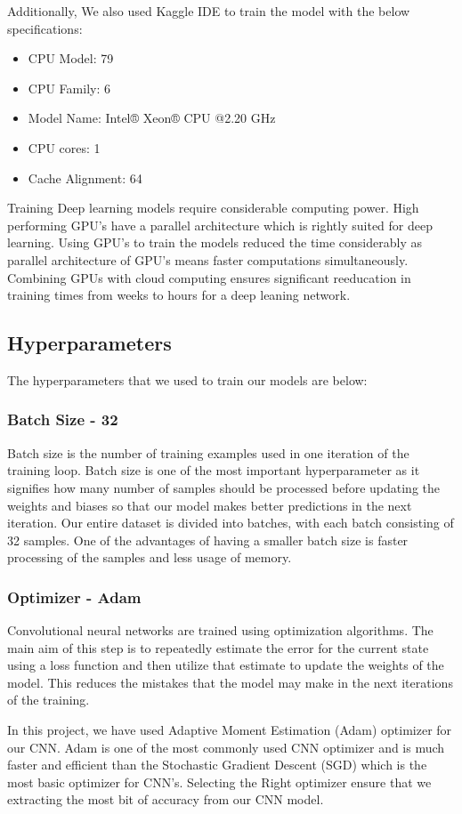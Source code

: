 \documentclass[conference]{IEEEtran}
\begin{document}
\vspace{5pt}
Additionally, We also used Kaggle IDE to train the model with the below specifications:
\begin{itemize}
  \item CPU Model: 79
  \item CPU Family: 6
  \item Model Name: Intel® Xeon® CPU @2.20 GHz
  \item CPU cores: 1
  \item Cache Alignment: 64
\end{itemize}

Training Deep learning models require considerable computing power. High performing GPU's have a parallel architecture which is rightly suited for deep learning. Using GPU's to train the models reduced the time considerably as parallel architecture of GPU's means faster computations simultaneously. Combining GPUs with cloud computing ensures significant reeducation in training times from weeks to hours for a deep leaning network.

\subsection{Hyperparameters}
The hyperparameters that we used to train our models are below:
\subsubsection{Batch Size - 32}
Batch size is the number of training examples used in one iteration of the training loop. Batch size is one of the most important hyperparameter as it signifies how many number of samples should be processed before updating the weights and biases so that our model makes better predictions in the next iteration. Our entire dataset is divided into batches, with each batch consisting of 32 samples. One of the advantages of having a smaller batch size is faster processing of the samples and less usage of memory.

\vspace{5pt}
\subsubsection{Optimizer - Adam}
Convolutional neural networks are trained using optimization algorithms. The main aim of this step is to repeatedly estimate the error for the current state using a loss function and then utilize that estimate to update the weights of the model. This reduces the mistakes that the model may make in the next iterations of the training.
\par
In this project, we have used Adaptive Moment Estimation (Adam) optimizer for our CNN. Adam is one of the most commonly used CNN optimizer and is much faster and efficient than the Stochastic Gradient Descent (SGD) which is the most basic optimizer for CNN's. Selecting the Right optimizer ensure that we extracting the most bit of accuracy from our CNN model.
\end{document}
